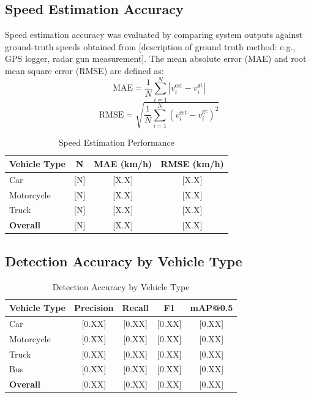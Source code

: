 \documentclass[12pt]{report}
\begin{document}
\subsection{Speed Estimation Accuracy}

Speed estimation accuracy was evaluated by comparing system outputs against ground-truth speeds obtained from [description of ground truth method: e.g., GPS logger, radar gun measurement].
The mean absolute error (MAE) and root mean square error (RMSE) are defined as:
\begin{equation}
    \text{MAE} = \frac{1}{N} \sum_{i=1}^{N} |v_i^\text{est} - v_i^\text{gt}|
    \label{eq:mae}
\end{equation}
\begin{equation}
    \text{RMSE} = \sqrt{\frac{1}{N} \sum_{i=1}^{N} (v_i^\text{est} - v_i^\text{gt})^2}
    \label{eq:rmse}
\end{equation}

\begin{table}[H]
    \centering
    \caption{Speed Estimation Performance}
    \label{tab:speed_accuracy}
    \begin{tabular}{lccc}
        \toprule
        \textbf{Vehicle Type} & \textbf{N} & \textbf{MAE (km/h)} & \textbf{RMSE (km/h)} \\
        \midrule
        Car & [N] & [X.X] & [X.X] \\
        Motorcycle & [N] & [X.X] & [X.X] \\
        Truck & [N] & [X.X] & [X.X] \\
        \midrule
        \textbf{Overall} & [N] & [X.X] & [X.X] \\
        \bottomrule
    \end{tabular}
\end{table}

\subsection{Detection Accuracy by Vehicle Type}

\begin{table}[H]
    \centering
    \caption{Detection Accuracy by Vehicle Type}
    \label{tab:detection_accuracy}
    \begin{tabular}{lcccc}
        \toprule
        \textbf{Vehicle Type} & \textbf{Precision} & \textbf{Recall} & \textbf{F1} & \textbf{mAP@0.5} \\
        \midrule
        Car & [0.XX] & [0.XX] & [0.XX] & [0.XX] \\
        Motorcycle & [0.XX] & [0.XX] & [0.XX] & [0.XX] \\
        Truck & [0.XX] & [0.XX] & [0.XX] & [0.XX] \\
        Bus & [0.XX] & [0.XX] & [0.XX] & [0.XX] \\
        \midrule
        \textbf{Overall} & [0.XX] & [0.XX] & [0.XX] & [0.XX] \\
        \bottomrule
    \end{tabular}
\end{table}
\end{document}
